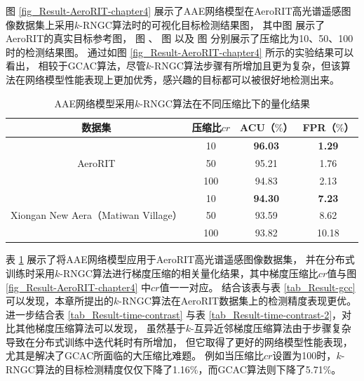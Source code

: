 \documentclass{xdupgthesis}
\begin{document}
图 \ref*{fig_Result-AeroRIT-chapter4} 展示了AAE网络模型在AeroRIT高光谱遥感图像数据集上采用$k$-RNGC算法时的可视化目标检测结果图，
其中图  展示了AeroRIT的真实目标参考图，
图  、
图  以及
图  分别展示了压缩比为10、50、100时的检测结果图。
通过如图 \ref{fig_Result-AeroRIT-chapter4} 所示的实验结果可以看出，
相较于GCAC算法，尽管$k$-RNGC算法步骤有所增加且更为复杂，但该算法在网络模型性能表现上更加优秀，感兴趣的目标都可以被很好地检测出来。

\renewcommand{\arraystretch}{1.3}
\begin{table}[ht]
    \centering
    \begin{threeparttable}
        \caption{AAE网络模型采用$k$-RNGC算法在不同压缩比下的量化结果}
        \label{tab_Result-k-RNGC-AeroRIT-Xiongan}
        \begin{tabular}{c|c|c|c}
            \toprule
            \toprule
            数据集 & 压缩比$cr$ & ACU（$\%$） & FPR（$\%$） \\
            \midrule
            \multirow{3}{*}{AeroRIT} & 10 & \textbf{96.03} & \textbf{1.29} \\
                                    & 50 & 95.21 & 1.76 \\
                                    & 100 & 94.83 & 2.13 \\
            \midrule
            \multirow{3}{*}{Xiongan New Aera（Matiwan Village）} & 10 & \textbf{94.30} & \textbf{7.23} \\
                                                & 50 & 93.59 & 8.62 \\
                                                & 100 & 93.82 & 10.18 \\
            \bottomrule
            \bottomrule
        \end{tabular}
    \end{threeparttable}
\end{table}

表 \ref{tab_Result-k-RNGC-AeroRIT-Xiongan} 展示了将AAE网络模型应用于AeroRIT高光谱遥感图像数据集，
并在分布式训练时采用$k$-RNGC算法进行梯度压缩的相关量化结果，其中梯度压缩比$cr$值与图 \ref*{fig_Result-AeroRIT-chapter4} 中$cr$值一一对应。
结合该表与表 \ref*{tab_Result-gcc} 可以发现，本章所提出的$k$-RNGC算法在AeroRIT数据集上的检测精度表现更优。
进一步结合表 \ref*{tab_Result-time-contrast} 与表 \ref*{tab_Result-time-contrast-2}，对比其他梯度压缩算法可以发现，
虽然基于$k$-互异近邻梯度压缩算法由于步骤复杂导致在分布式训练中迭代耗时有所增加，
但它取得了更好的网络模型性能表现，尤其是解决了GCAC所面临的大压缩比难题。
例如当压缩比$cr$设置为100时，$k$-RNGC算法的目标检测精度仅仅下降了1.16$\%$，而GCAC算法则下降了5.71$\%$。
\end{document}

